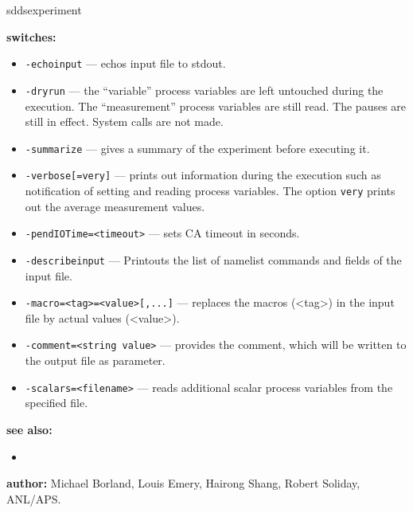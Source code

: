 \begin{sddsprog}{sddsexperiment}
\item \textbf{switches:}
\begin{itemize}
  \item {\verb+-echoinput+} --- echos input file to stdout.
  \item {\verb+-dryrun+} --- the ``variable'' process variables are left untouched during the execution. The ``measurement''
                process variables are still read. The pauses are still in effect. System calls are not made.
  \item {\verb+-summarize+} --- gives a summary of the experiment before executing it.
  \item {\verb+-verbose[=very]+} --- prints out information during the execution such as notification of
                setting and reading process variables. The option \verb+very+ prints out the average measurement values.
  \item {\verb+-pendIOTime=<timeout>+} --- sets CA timeout in seconds.
  \item {\verb+-describeinput+} --- Printouts the list of namelist commands and fields of the input file.
  \item {\verb+-macro=<tag>=<value>[,...]+} --- replaces the macros (\textless tag\textgreater) in the input file by actual values (\textless value\textgreater).
  \item {\verb+-comment=<string value>+} --- provides the comment, which will be written to the output file as parameter.
  \item {\verb+-scalars=<filename>+} --- reads additional scalar process variables from the specified file.
\end{itemize}

\item \textbf{see also:}
\begin{itemize}
  \item {}
\end{itemize}
\item \textbf{author:} Michael Borland, Louis Emery, Hairong Shang, Robert Soliday, ANL/APS.
\end{sddsprog}

